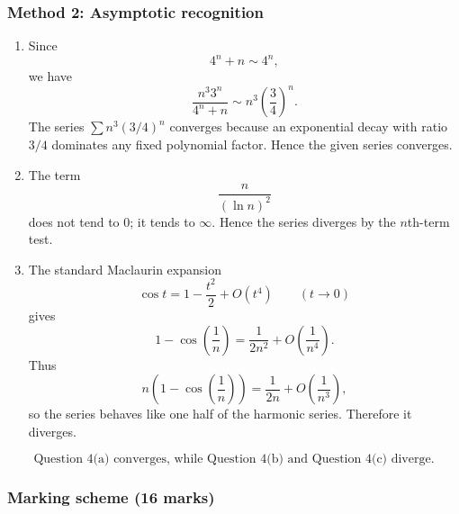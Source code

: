 \documentclass[12pt]{article}
\begin{document}
\newpage
\subsubsection{Method 2: Asymptotic recognition}

\begin{enumerate}[label=(\alph*)]
\item Since
\[
4^n+n\sim 4^n,
\]
we have
\[
\frac{n^3 3^n}{4^n+n}\sim n^3\left(\frac34\right)^n.
\]
The series $\sum n^3(3/4)^n$ converges because an exponential decay with ratio $3/4$ dominates any fixed polynomial factor. Hence the given series converges.

\item The term
\[
\frac{n}{(\ln n)^2}
\]
does not tend to $0$; it tends to $\infty$. Hence the series diverges by the $n$th-term test.

\item The standard Maclaurin expansion
\[
\cos t=1-\frac{t^2}{2}+O(t^4)
\qquad (t\to 0)
\]
gives
\[
1-\cos\left(\frac1n\right)
=\frac{1}{2n^2}+O\left(\frac{1}{n^4}\right).
\]
Thus
\[
n\left(1-\cos\left(\frac1n\right)\right)
=\frac{1}{2n}+O\left(\frac{1}{n^3}\right),
\]
so the series behaves like one half of the harmonic series. Therefore it diverges.
\end{enumerate}

\[
\boxed{\text{Question 4(a) converges, while Question 4(b) and Question 4(c) diverge.}}
\]

\subsubsection{Marking scheme (16 marks)}
\end{document}
